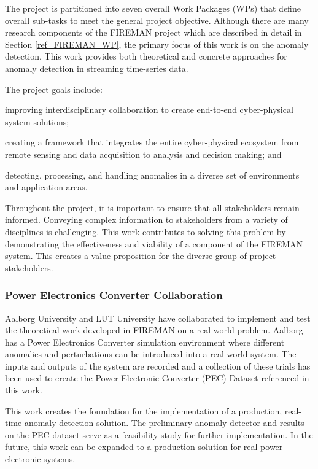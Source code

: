 The project is partitioned into seven overall Work Packages (WPs) that define overall sub-tasks to meet the general project objective.
Although there are many research components of the FIREMAN project which are described in detail in Section \ref{ref_FIREMAN_WP}, the primary focus of this work is on the anomaly detection. This work provides both theoretical and concrete approaches for anomaly detection in streaming time-series data.

The project goals include:
\begin{inlinelist}
    \item improving interdisciplinary collaboration to create end-to-end cyber-physical system solutions;
    \item creating a framework that integrates the entire cyber-physical ecosystem from remote sensing and data acquisition to analysis and decision making; and
    \item detecting, processing, and handling anomalies in a diverse set of environments and application areas.
\end{inlinelist}


Throughout the project, it is important to ensure that all stakeholders remain informed. Conveying complex information to stakeholders from a variety of disciplines is challenging. This work contributes to solving this problem by demonstrating the effectiveness and viability of a component of the FIREMAN system. This creates a value proposition for the diverse group of project stakeholders. 

\subsubsection{Power Electronics Converter Collaboration}

Aalborg University and LUT University have collaborated to implement and test the theoretical work developed in FIREMAN on a real-world problem. Aalborg has a Power Electronics Converter simulation environment where different anomalies and perturbations can be introduced into a real-world system. The inputs and outputs of the system are recorded and a collection of these trials has been used to create the Power Electronic Converter (PEC) Dataset referenced in this work.

This work creates the foundation for the implementation of a production, real-time anomaly detection solution. The preliminary anomaly detector and results on the PEC dataset serve as a feasibility study for further implementation. In the future, this work can be expanded to a production solution for real power electronic systems.



